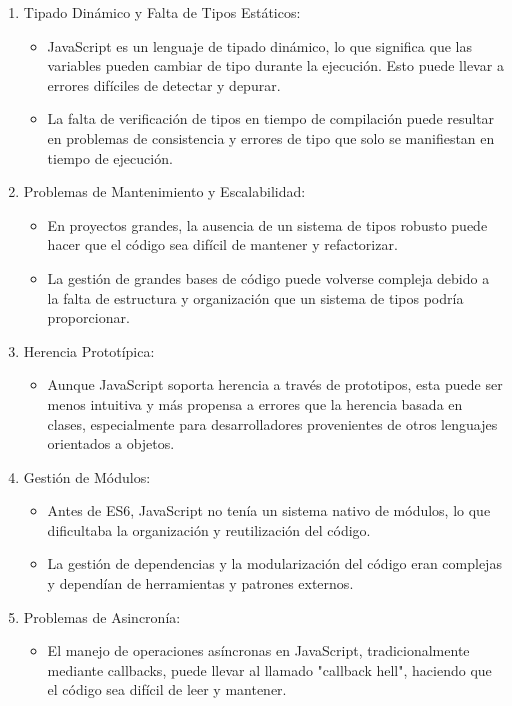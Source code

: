 \documentclass{article}
\begin{document}
\begin{enumerate}
    \item Tipado Dinámico y Falta de Tipos Estáticos:
          \begin{itemize}
              \item JavaScript es un lenguaje de tipado dinámico, lo que significa que las variables pueden cambiar de
                    tipo durante la ejecución. Esto puede llevar a errores difíciles de detectar y depurar.
              \item La falta de verificación de tipos en tiempo de compilación puede resultar en problemas de
                    consistencia y errores de tipo que solo se manifiestan en tiempo de ejecución.
          \end{itemize}
    \item Problemas de Mantenimiento y Escalabilidad:
          \begin{itemize}
              \item En proyectos grandes, la ausencia de un sistema de tipos robusto puede hacer que el código sea
                    difícil de mantener y refactorizar.
              \item La gestión de grandes bases de código puede volverse compleja debido a la falta de estructura y
                    organización que un sistema de tipos podría proporcionar.
          \end{itemize}
    \item Herencia Prototípica:
          \begin{itemize}
              \item Aunque JavaScript soporta herencia a través de prototipos, esta puede ser menos intuitiva y más
                    propensa a errores que la herencia basada en clases, especialmente para desarrolladores
                    provenientes de otros lenguajes orientados a objetos.
          \end{itemize}
    \item Gestión de Módulos:
          \begin{itemize}
              \item Antes de ES6, JavaScript no tenía un sistema nativo de módulos, lo que dificultaba la
                    organización y reutilización del código.
              \item La gestión de dependencias y la modularización del código eran complejas y dependían de
                    herramientas y patrones externos.
          \end{itemize}
    \item Problemas de Asincronía:
          \begin{itemize}
              \item El manejo de operaciones asíncronas en JavaScript, tradicionalmente mediante callbacks, puede
                    llevar al llamado "callback hell", haciendo que el código sea difícil de leer y mantener.
          \end{itemize}
\end{enumerate}
\end{document}
